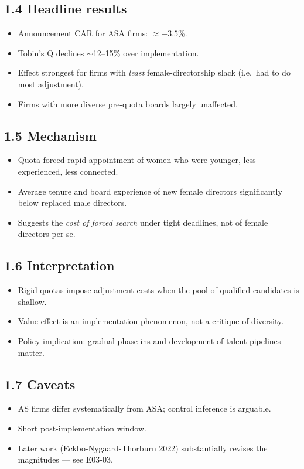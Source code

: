 \documentclass[11pt]{article}
\begin{document}
\subsection*{1.4 Headline results}
\begin{itemize}
\item Announcement CAR for ASA firms: $\approx -3.5$\%.
\item Tobin's Q declines $\sim$12--15\% over implementation.
\item Effect strongest for firms with \emph{least} female-directorship slack (i.e.\ had to do most adjustment).
\item Firms with more diverse pre-quota boards largely unaffected.
\end{itemize}

\subsection*{1.5 Mechanism}
\begin{itemize}
\item Quota forced rapid appointment of women who were younger, less experienced, less connected.
\item Average tenure and board experience of new female directors significantly below replaced male directors.
\item Suggests the \emph{cost of forced search} under tight deadlines, not of female directors per se.
\end{itemize}

\subsection*{1.6 Interpretation}
\begin{itemize}
\item Rigid quotas impose adjustment costs when the pool of qualified candidates is shallow.
\item Value effect is an implementation phenomenon, not a critique of diversity.
\item Policy implication: gradual phase-ins and development of talent pipelines matter.
\end{itemize}

\subsection*{1.7 Caveats}
\begin{alertbox}
\begin{itemize}
\item AS firms differ systematically from ASA; control inference is arguable.
\item Short post-implementation window.
\item Later work (Eckbo-Nygaard-Thorburn 2022) substantially revises the magnitudes --- see E03-03.
\end{itemize}
\end{alertbox}
\end{document}
